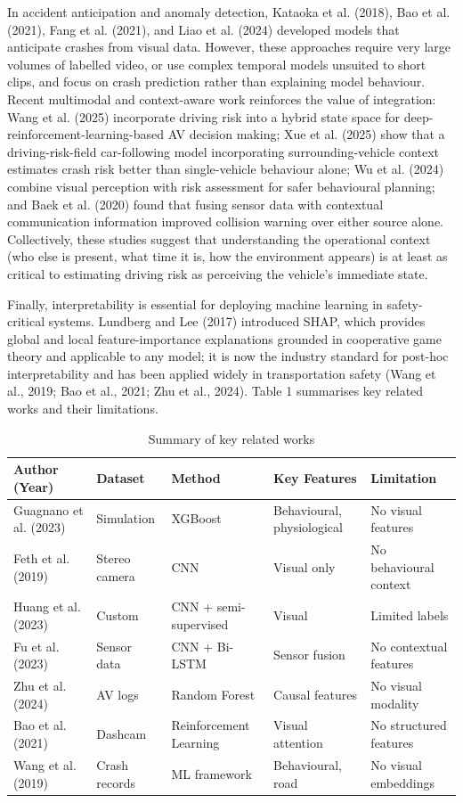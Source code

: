 \documentclass[11pt,a4paper]{article}
\begin{document}
In accident anticipation and anomaly detection, Kataoka et al. (2018), Bao et al. (2021), Fang et al. (2021), and Liao et al. (2024) developed models that anticipate crashes from visual data. However, these approaches require very large volumes of labelled video, or use complex temporal models unsuited to short clips, and focus on crash prediction rather than explaining model behaviour. Recent multimodal and context-aware work reinforces the value of integration: Wang et al. (2025) incorporate driving risk into a hybrid state space for deep-reinforcement-learning-based AV decision making; Xue et al. (2025) show that a driving-risk-field car-following model incorporating surrounding-vehicle context estimates crash risk better than single-vehicle behaviour alone; Wu et al. (2024) combine visual perception with risk assessment for safer behavioural planning; and Baek et al. (2020) found that fusing sensor data with contextual communication information improved collision warning over either source alone. Collectively, these studies suggest that understanding the operational context (who else is present, what time it is, how the environment appears) is at least as critical to estimating driving risk as perceiving the vehicle's immediate state.

Finally, interpretability is essential for deploying machine learning in safety-critical systems. Lundberg and Lee (2017) introduced SHAP, which provides global and local feature-importance explanations grounded in cooperative game theory and applicable to any model; it is now the industry standard for post-hoc interpretability and has been applied widely in transportation safety (Wang et al., 2019; Bao et al., 2021; Zhu et al., 2024). Table 1 summarises key related works and their limitations.

\begin{table}[H]
\centering\small
\caption{Summary of key related works}
\begin{tabularx}{\textwidth}{LLLLL}
\toprule
\textbf{Author (Year)} & \textbf{Dataset} & \textbf{Method} & \textbf{Key Features} & \textbf{Limitation} \\
\midrule
Guagnano et al. (2023) & Simulation & XGBoost & Behavioural, physiological & No visual features \\
Feth et al. (2019) & Stereo camera & CNN & Visual only & No behavioural context \\
Huang et al. (2023) & Custom & CNN + semi-supervised & Visual & Limited labels \\
Fu et al. (2023) & Sensor data & CNN + Bi-LSTM & Sensor fusion & No contextual features \\
Zhu et al. (2024) & AV logs & Random Forest & Causal features & No visual modality \\
Bao et al. (2021) & Dashcam & Reinforcement Learning & Visual attention & No structured features \\
Wang et al. (2019) & Crash records & ML framework & Behavioural, road & No visual embeddings \\
\bottomrule
\end{tabularx}
\end{table}
\end{document}
